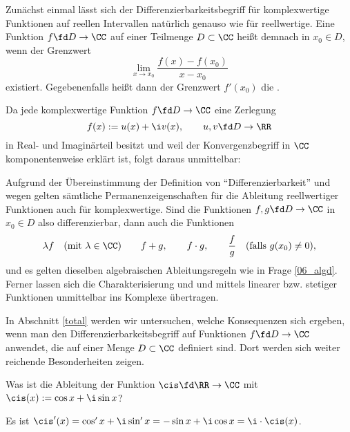 \begin{antwort}
 Zunächst einmal lässt sich der Differenzierbarkeitsbegriff 
für komplexwertige Funktionen auf reellen 
Intervallen natürlich genauso  
wie für reellwertige. Eine Funktion $f\fd D\to \CC$ auf einer 
Teilmenge $D\subset \CC$ heißt demnach  in 
$x_0\in D$, wenn der Grenzwert
\[
\lim_{x\to x_0} \frac{f(x)-f(x_0)}{x-x_0}
\]
existiert. Gegebenenfalls heißt dann der Grenzwert $f'(x_0)$ die 
. 

Da jede komplexwertige Funktion 
$f\fd D\to \CC$ eine Zerlegung 
\[
f(x) := u(x) + \i  v(x),\qquad u,v \fd D\to \RR 
\] 
in Real- und Imaginärteil besitzt und weil der 
Konvergenzbegriff in $\CC$ komponentenweise erklärt ist, folgt daraus 
unmittelbar:

\medskip
\noindent{}
Aufgrund der Übereinstimmung der Definition von 
"`Differenzierbarkeit"'  und wegen {\astref} gelten 
sämtliche Permanenzeigenschaften für die Ableitung reellwertiger 
Funktionen auch für komplexwertige.   
Sind die Funktionen $f,g \fd D\to \CC$ in $x_0\in D$ 
also differenzierbar, dann auch die Funktionen 
\[
\lambda f\quad \text{(mit $\lambda\in \CC$)} 
\qquad f+g, \qquad f\cdot g,\qquad 
\frac{f}{g}\quad \text{(falls $g(x_0) \not=0$)},
\]   
und es gelten dieselben algebraischen Ableitungsregeln wie in Frage 
\ref{06_algd}. 
Ferner lassen sich die Charakterisierung  und  und 
 mittels linearer bzw. stetiger Funktionen unmittelbar ins  
Komplexe übertragen. 

In Abschnitt \ref{total} werden wir untersuchen, welche Konsequenzen
sich ergeben, wenn 
man den Differenzierbarkeitsbegriff auf Funktionen 
$f\fd D\to\CC$ anwendet, die auf einer Menge $D\subset \CC$ 
definiert sind. Dort werden sich weiter reichende Besonderheiten zeigen.  
\AntEnd
\end{antwort} 

\begin{frage}
Was ist die Ableitung der Funktion 
$\cis \fd \RR\to\CC$ mit 
$\cis(x):= \cos x +\i \sin x $?
\end{frage}

\begin{antwort}
 Es ist $\cis'(x) = \cos'x+\i \sin' x=-\sin x+\i\cos x = 
\i \cdot \cis(x)$. 
\end{antwort}
  
